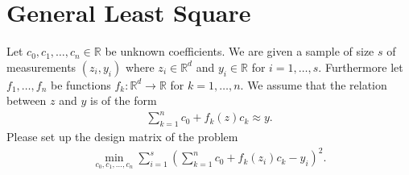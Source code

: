 \section{General Least Square}
Let $c_0, c_1, \dots, c_n \in \mathbb{R}$ be unknown coefficients.
We are given a sample of size $s$ of measurements $(z_i, y_i)$ where $z_i\in\mathbb{R}^d$ and $y_i\in\mathbb{R}$ for $i=1,\dots,s$. Furthermore let
$f_1, \dots, f_n$ be functions $f_k:\mathbb{R}^d \rightarrow \mathbb{R}$ for $k = 1,\dots,n$. 
We assume that the relation between $z$ and $y$ is of the form
\begin{align*}
\sum_{k=1}^n c_0 + f_k(z)c_k \approx y.
\end{align*}
Please set up the design matrix of the problem
\begin{align*}
\min \limits_{c_0, c_1, \dots, c_n} \sum_{i=1}^s \left( \sum_{k=1}^n c_0 + f_k(z_i)c_k - y_i\right)^2.
\end{align*}